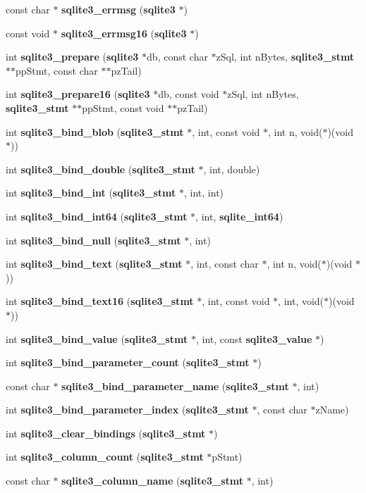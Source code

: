 \begin{DoxyCompactItemize}
\item 
const char $\ast$ {\bf sqlite3\_\-errmsg} ({\bf sqlite3} $\ast$)
\item 
const void $\ast$ {\bf sqlite3\_\-errmsg16} ({\bf sqlite3} $\ast$)
\item 
int {\bf sqlite3\_\-prepare} ({\bf sqlite3} $\ast$db, const char $\ast$zSql, int nBytes, {\bf sqlite3\_\-stmt} $\ast$$\ast$ppStmt, const char $\ast$$\ast$pzTail)
\item 
int {\bf sqlite3\_\-prepare16} ({\bf sqlite3} $\ast$db, const void $\ast$zSql, int nBytes, {\bf sqlite3\_\-stmt} $\ast$$\ast$ppStmt, const void $\ast$$\ast$pzTail)
\item 
int {\bf sqlite3\_\-bind\_\-blob} ({\bf sqlite3\_\-stmt} $\ast$, int, const void $\ast$, int n, void($\ast$)(void $\ast$))
\item 
int {\bf sqlite3\_\-bind\_\-double} ({\bf sqlite3\_\-stmt} $\ast$, int, double)
\item 
int {\bf sqlite3\_\-bind\_\-int} ({\bf sqlite3\_\-stmt} $\ast$, int, int)
\item 
int {\bf sqlite3\_\-bind\_\-int64} ({\bf sqlite3\_\-stmt} $\ast$, int, {\bf sqlite\_\-int64})
\item 
int {\bf sqlite3\_\-bind\_\-null} ({\bf sqlite3\_\-stmt} $\ast$, int)
\item 
int {\bf sqlite3\_\-bind\_\-text} ({\bf sqlite3\_\-stmt} $\ast$, int, const char $\ast$, int n, void($\ast$)(void $\ast$))
\item 
int {\bf sqlite3\_\-bind\_\-text16} ({\bf sqlite3\_\-stmt} $\ast$, int, const void $\ast$, int, void($\ast$)(void $\ast$))
\item 
int {\bf sqlite3\_\-bind\_\-value} ({\bf sqlite3\_\-stmt} $\ast$, int, const {\bf sqlite3\_\-value} $\ast$)
\item 
int {\bf sqlite3\_\-bind\_\-parameter\_\-count} ({\bf sqlite3\_\-stmt} $\ast$)
\item 
const char $\ast$ {\bf sqlite3\_\-bind\_\-parameter\_\-name} ({\bf sqlite3\_\-stmt} $\ast$, int)
\item 
int {\bf sqlite3\_\-bind\_\-parameter\_\-index} ({\bf sqlite3\_\-stmt} $\ast$, const char $\ast$zName)
\item 
int {\bf sqlite3\_\-clear\_\-bindings} ({\bf sqlite3\_\-stmt} $\ast$)
\item 
int {\bf sqlite3\_\-column\_\-count} ({\bf sqlite3\_\-stmt} $\ast$pStmt)
\item 
const char $\ast$ {\bf sqlite3\_\-column\_\-name} ({\bf sqlite3\_\-stmt} $\ast$, int)

\end{DoxyCompactItemize}
